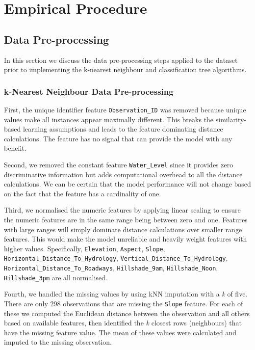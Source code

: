 \documentclass[10pt, conference]{IEEEtran}
\begin{document}
\section{Empirical Procedure}

\subsection{Data Pre-processing}
In this section we discuss the data pre-processing steps applied to the dataset prior to implementing the k-nearest neighbour and classification tree algorithms.
\subsubsection{k-Nearest Neighbour Data Pre-processing}
First, the unique identifier feature \texttt{Observation\_ID} was removed because unique values make all instances appear maximally different. This breaks the similarity-based learning assumptions and leads to the feature dominating distance calculations. The feature has no signal that can provide the model with any benefit.

Second, we removed the constant feature \texttt{Water\_Level} since it provides zero discriminative information but adds computational overhead to all the distance calculations. We can be certain that the model performance will not change based on the fact that the feature has a cardinality of one.

Third, we normalised the numeric features by applying linear scaling to ensure the numeric features are in the same range being between zero and one. Features with large ranges will simply dominate distance calculations over smaller range features. This would make the model unreliable and heavily weight features with higher values. Specifically, \texttt{Elevation}, \texttt{Aspect}, \texttt{Slope}, \texttt{Horizontal\_Distance\_To\_Hydrology}, \texttt{Vertical\_Distance\_To\_Hydrology}, \texttt{Horizontal\_Distance\_To\_Roadways}, \texttt{Hillshade\_9am}, \texttt{Hillshade\_Noon}, \texttt{Hillshade\_3pm}
 are all normalised.
 
 Fourth, we handled the missing values by using kNN imputation with a \textit{k} of five. There are only 298 observations that are missing the \texttt{Slope} feature. For each of these we computed the Euclidean distance between the observation and all others based on available features, then identified the \textit{k} closest rows (neighbours) that have the missing feature value. The mean of these values were calculated and imputed to the missing observation.
 
\end{document}
